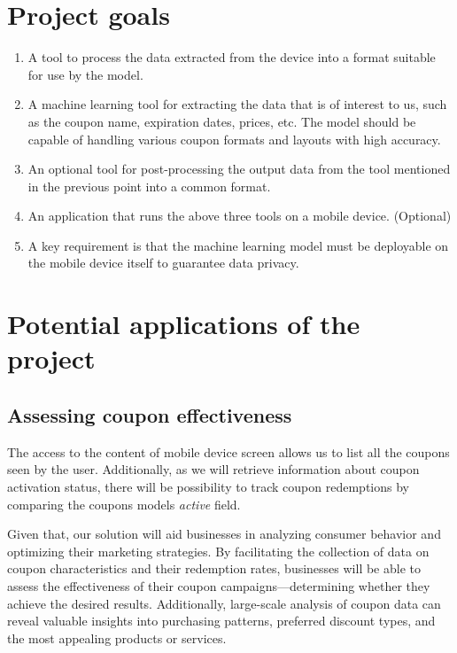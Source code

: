 \documentclass[licencjacka,en]{pracamgr}
\begin{document}
\section{Project goals}
\begin{enumerate}
    \item A tool to process the data extracted from the device into a format suitable for use by the model.
    \item A machine learning tool for extracting the data that is of interest to us, such as the coupon name, expiration dates, prices, etc. The model should be capable of handling various coupon formats and layouts with high accuracy.
    \item An optional tool for post-processing the output data from the tool mentioned in the previous point into a common format.
    \item An application that runs the above three tools on a mobile device. (Optional)
    \item A key requirement is that the machine learning model must be deployable on the mobile device itself to guarantee data privacy.
\end{enumerate}

\section{Potential applications of the project}
\subsection{Assessing coupon effectiveness}
The access to the content of mobile device screen allows us to list all the coupons seen by the user. Additionally, as we will retrieve information about coupon activation status, there will be possibility to track coupon redemptions by comparing the coupons models \textit{active} field.

Given that, our solution will aid businesses in analyzing consumer behavior and optimizing their marketing strategies. By facilitating the collection of data on coupon characteristics and their redemption rates, businesses will be able to assess the effectiveness of their coupon campaigns—determining whether they achieve the desired results. Additionally, large-scale analysis of coupon data can reveal valuable insights into purchasing patterns, preferred discount types, and the most appealing products or services.
\end{document}
